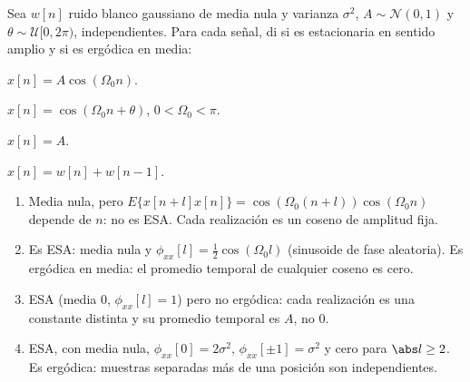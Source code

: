 \documentclass[11pt,a4paper]{scrartcl}
\begin{document}
\begin{ejercicio}
  Sea $w[n]$ ruido blanco gaussiano de media nula y varianza $\sigma^2$, $A\sim\mathcal N(0,1)$ y $\theta\sim\mathcal U[0,2\pi)$, independientes. Para cada señal, di si es estacionaria en sentido amplio y si es ergódica en media:
  \begin{incisos}[2]
    \item $x[n]=A\cos(\Omega_0n)$.
    \item $x[n]=\cos(\Omega_0n+\theta)$, $0<\Omega_0<\pi$.
    \item $x[n]=A$.
    \item $x[n]=w[n]+w[n-1]$.
  \end{incisos}
\end{ejercicio}
\begin{solucion}
  \begin{enumerate}[label=\alph*)]
    \item Media nula, pero $E\{x[n+l]x[n]\}=\cos(\Omega_0(n+l))\cos(\Omega_0n)$ depende de $n$: no es ESA. Cada realización es un coseno de amplitud fija.
    \item Es ESA: media nula y $\phi_{xx}[l]=\frac12\cos(\Omega_0l)$ (sinusoide de fase aleatoria). Es ergódica en media: el promedio temporal de cualquier coseno es cero.
    \item ESA (media 0, $\phi_{xx}[l]=1$) pero no ergódica: cada realización es una constante distinta y su promedio temporal es $A$, no 0.
    \item ESA, con media nula, $\phi_{xx}[0]=2\sigma^2$, $\phi_{xx}[\pm1]=\sigma^2$ y cero para $\abs l\ge2$. Es ergódica: muestras separadas más de una posición son independientes.
  \end{enumerate}
\end{solucion}
\end{document}
